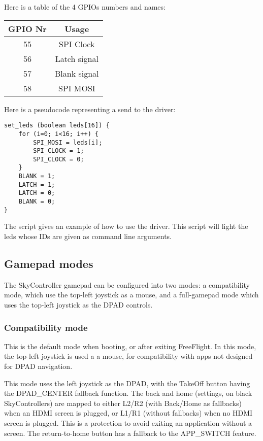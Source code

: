 Here is a table of the 4 GPIOs numbers and names:
\begin{table}[h]
\centering
\begin{tabular}{|c|c|}
  \hline
  GPIO Nr & Usage \\
  \hline
  \hline
  55 & SPI Clock \\
  \hline
  56 & Latch signal \\
  \hline
  57 & Blank signal \\
  \hline
  58 & SPI MOSI \\
  \hline
\end{tabular}
\end{table}

Here is a pseudocode representing a send to the driver:\\
\begin{lstlisting}[frame=single]
set_leds (boolean leds[16]) {
    for (i=0; i<16; i++) {
        SPI_MOSI = leds[i];
        SPI_CLOCK = 1;
        SPI_CLOCK = 0;
    }
    BLANK = 1;
    LATCH = 1;
    LATCH = 0;
    BLANK = 0;
}
\end{lstlisting}

The  script gives an example of how to use the driver. This script will light the leds whose IDs are given as command line arguments.


\subsection{Gamepad modes}

The SkyController gamepad can be configured into two modes: a compatibility mode, which use the top-left joystick as a mouse, and a full-gamepad mode which uses the top-left joystick as the DPAD controls.

\subsubsection{Compatibility mode}

This is the default mode when booting, or after exiting FreeFlight. In this mode, the top-left joystick is used a a mouse, for compatibility with apps not designed for DPAD navigation.

This mode uses the left joystick as the DPAD, with the TakeOff button having the DPAD\_CENTER fallback function. The back and home (settings, on black SkyControllers) are mapped to either L2/R2 (with Back/Home as fallbacks) when an HDMI screen is plugged, or L1/R1 (without fallbacks) when no HDMI screen is plugged. This is a protection to avoid exiting an application without a screen. The return-to-home button has a fallback to the APP\_SWITCH feature.

